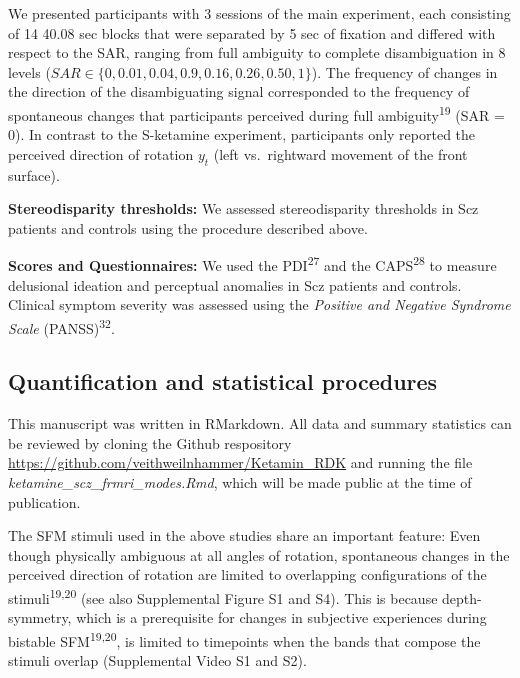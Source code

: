 \documentclass[
]{article}
\begin{document}
We presented participants with 3 sessions of the main experiment, each
consisting of 14 40.08 sec blocks that were separated by 5 sec of
fixation and differed with respect to the SAR, ranging from full
ambiguity to complete disambiguation in 8 levels
(\(SAR \in \{ 0, 0.01, 0.04, 0.9, 0.16, 0.26, 0.50, 1 \}\)). The
frequency of changes in the direction of the disambiguating signal
corresponded to the frequency of spontaneous changes that participants
perceived during full ambiguity\textsuperscript{19} (SAR = 0). In
contrast to the S-ketamine experiment, participants only reported the
perceived direction of rotation \(y_t\) (left vs.~rightward movement of
the front surface).

\textbf{Stereodisparity thresholds:} We assessed stereodisparity
thresholds in Scz patients and controls using the procedure described
above.

\textbf{Scores and Questionnaires:} We used the PDI\textsuperscript{27}
and the CAPS\textsuperscript{28} to measure delusional ideation and
perceptual anomalies in Scz patients and controls. Clinical symptom
severity was assessed using the \emph{Positive and Negative Syndrome
Scale} (PANSS)\textsuperscript{32}.

\hypertarget{quantification-and-statistical-procedures}{%
\subsection{Quantification and statistical
procedures}\label{quantification-and-statistical-procedures}}

This manuscript was written in RMarkdown. All data and summary
statistics can be reviewed by cloning the Github respository
\url{https://github.com/veithweilnhammer/Ketamin_RDK} and running the
file \emph{ketamine\_scz\_frmri\_modes.Rmd}, which will be made public
at the time of publication.

The SFM stimuli used in the above studies share an important feature:
Even though physically ambiguous at all angles of rotation, spontaneous
changes in the perceived direction of rotation are limited to
overlapping configurations of the stimuli\textsuperscript{19,20} (see
also Supplemental Figure S1 and S4). This is because depth-symmetry,
which is a prerequisite for changes in subjective experiences during
bistable SFM\textsuperscript{19,20}, is limited to timepoints when the
bands that compose the stimuli overlap (Supplemental Video S1 and S2).
\end{document}
